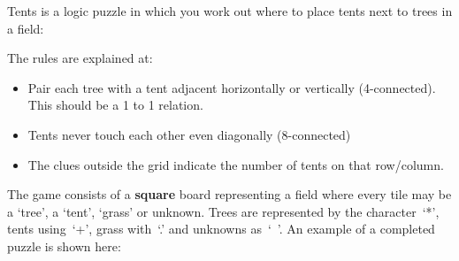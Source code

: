 
Tents is a logic puzzle in which you work out where to place tents next to trees
in a field:

The rules are explained at:


\begin{itemize}
\item Pair each tree with a tent adjacent horizontally or vertically (4-connected).
This should be a 1 to 1 relation.
\item Tents never touch each other even diagonally (8-connected)
\item The clues outside the grid indicate the number of tents on that row/column.
\end{itemize}
\noindent The game consists of a {\bf square} board representing a field where every
tile may be a `tree', a `tent', `grass' or unknown.
Trees are represented by the character~`*', tents using~`+', grass with~`.' and unknowns as~`~'.
An example of a completed puzzle is shown here:
